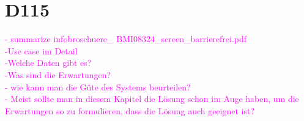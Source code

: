 %
%

\section{D115}
\textcolor{magenta}{
	- summarize infobroschuere\_ BMI08324\_screen\_barrierefrei.pdf\\
	-Use case im Detail\\
	-Welche Daten gibt es?\\	  
	-Was sind die Erwartungen?\\ 	
	- wie kann man die G\"ute des Systems beurteilen?\\   
	- Meist sollte man in diesem Kapitel die L\"osung schon im Auge haben, um die Erwartungen so zu formulieren, dass die L\"osung auch geeignet ist?\\ 
}


